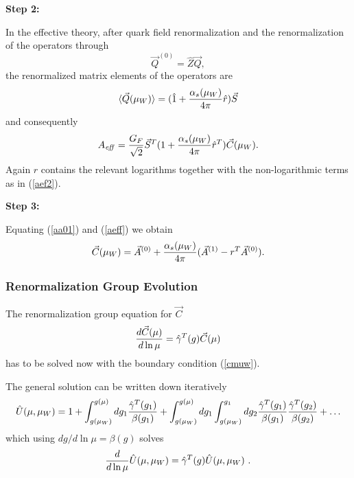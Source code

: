 \documentclass[12pt]{article}
\def\as{\alpha_s}
\begin{document}
\begin{itemize}
\begin{itemize}
\begin{itemize}
{\bf Step 2:}

In the effective theory,
after quark field renormalization and the
renormalization of the operators through
\begin{equation}\label{q0z3}
\vec Q^{(0)}=\hat Z\vec Q,  
\end{equation}
the renormalized matrix elements of the operators
are
\begin{equation}\label{qars}
\langle\vec Q(\mu_W)\rangle=(\hat 1
+{\as(\mu_W)\over 4\pi} \hat r)\vec S  \end{equation}
and consequently
\begin{equation}\label{aeff}  A_{\it eff}=
{G_F\over\sqrt{2}}\vec S^T(1+{\as(\mu_W)\over 4\pi} \hat r^T) 
\vec C(\mu_W).\end{equation}
Again $\hat r$ contains the relevant logarithms together with
the non-logarithmic terms as in (\ref{aef2}).

{\bf Step 3:}

Equating (\ref{aa01}) and (\ref{aeff}) we obtain
\begin{equation}\label{cmuw} 
\vec C(\mu_W)=
\vec A^{(0)}+{\as(\mu_W)\over 4\pi}
(\vec A^{(1)}-r^T\vec A^{(0)}).
\end{equation}

\subsubsection{Renormalization Group Evolution}
The renormalization group equation for $\vec C$
\begin{equation}\label{rgcv}
{d \vec C(\mu)\over d\ln\mu}=\hat\gamma^T(g)\vec C(\mu)   
\end{equation}
has to be solved now with the boundary condition (\ref{cmuw}). 

The general solution can be written down iteratively
\begin{equation}\label{uit}
\hat U(\mu,\mu_W)=1+\int^{g(\mu)}_{g(\mu_W)}
dg_1{\hat\gamma^T(g_1)\over\beta(g_1)}+
\int^{g(\mu)}_{g(\mu_W)}dg_1\int^{g_1}_{g(\mu_W)}dg_2
{\hat\gamma^T(g_1)\over\beta(g_1)}{\hat\gamma^T(g_2)\over\beta(g_2)}+\ldots 
\end{equation}
which using $dg/d\ln\mu=\beta(g)$  solves
\begin{equation}\label{rgu}
{d\over d\ln\mu}\hat U(\mu, \mu_W)=\hat\gamma^T(g)\hat U(\mu, \mu_W)~.
   \end{equation}


\end{itemize}
\end{itemize}
\end{itemize}
\end{document}
